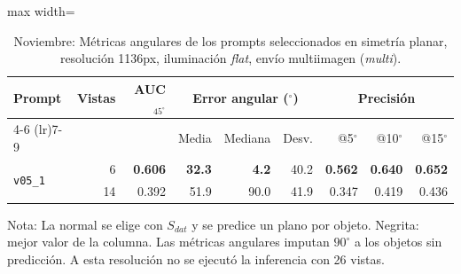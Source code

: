 \begin{table}[htbp]
\centering
\caption{Noviembre: Métricas angulares de los prompts seleccionados en simetría planar, resolución 1136px, iluminación \textit{flat}, envío multiimagen (\textit{multi}).}
\label{tab:nov_plane_1136_angular}
\begin{lrbox}{\tablebox}
\begin{adjustbox}{max width=\textwidth}
\begin{tabular}{lrrrrrrrr}
\toprule
\multirow{2}{*}{Prompt} & \multirow{2}{*}{Vistas} & \multirow{2}{*}{AUC$_{45^\circ}$} & \multicolumn{3}{c}{Error angular ($^\circ$)} & \multicolumn{3}{c}{Precisión} \\
\cmidrule(lr){4-6} \cmidrule(lr){7-9}
 &  &  & Media & Mediana & Desv. & @5$^\circ$ & @10$^\circ$ & @15$^\circ$ \\
\midrule
\multirow{2}{*}{\texttt{v05\_1}} & 6 & \textbf{0.606} & \textbf{32.3} & \textbf{4.2} & 40.2 & \textbf{0.562} & \textbf{0.640} & \textbf{0.652} \\
 & 14 & 0.392 & 51.9 & 90.0 & 41.9 & 0.347 & 0.419 & 0.436 \\
\bottomrule
\end{tabular}
\end{adjustbox}
\end{lrbox}
\usebox{\tablebox}

\vspace{1.5ex}
\begin{minipage}{\wd\tablebox}
\footnotesize
Nota: La normal se elige con $S_{dat}$ y se predice un plano por objeto. Negrita: mejor valor de la columna. Las métricas angulares imputan $90^\circ$ a los objetos sin predicción. A esta resolución no se ejecutó la inferencia con 26 vistas.
\end{minipage}
\end{table}

\clearpage

